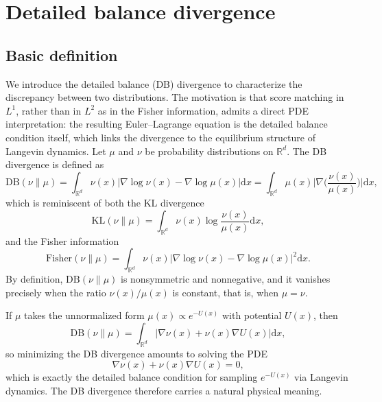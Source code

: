 \documentclass{article}
\newcommand{\D}{\mathrm{d}}
\newcommand{\DB}{\mathrm{DB}}
\newcommand{\KL}{\mathrm{KL}}
\newcommand{\Fish}{\mathrm{Fisher}}
\theoremstyle{plain}
\begin{document}
\section{Detailed balance divergence}\label{sec:db-divergence}

\subsection{Basic definition}

We introduce the detailed balance (DB) divergence to characterize the discrepancy between two distributions. The motivation is that score matching in $L^1$, rather than in $L^2$ as in the Fisher information, admits a direct PDE interpretation: the resulting Euler--Lagrange equation is the detailed balance condition itself, which links the divergence to the equilibrium structure of Langevin dynamics. Let $\mu$ and $\nu$ be probability distributions on $\mathbb R^d$. The DB divergence is defined as
\begin{equation}\label{eq:db-def}
    \DB(\nu\|\mu) = \int_{\mathbb R^d} \nu(x) \bigl|\nabla \log \nu(x) - \nabla \log \mu(x) \bigr| \D x = \int_{\mathbb R^d} \mu(x) \biggl|\nabla\biggl(\frac{\nu(x)}{\mu(x)}\biggr)\biggr| \D x,
\end{equation}
which is reminiscent of both the KL divergence
\begin{equation*}
    \KL(\nu\|\mu) = \int_{\mathbb R^d} \nu(x) \log \frac{\nu(x)}{\mu(x)} \D x,
\end{equation*}
and the Fisher information
\begin{equation*}
    \Fish(\nu\|\mu) = \int_{\mathbb R^d} \nu(x) \bigl|\nabla \log \nu(x) - \nabla \log \mu(x) \bigr|^2 \D x.
\end{equation*}
By definition, $\DB(\nu\|\mu)$ is nonsymmetric and nonnegative, and it vanishes precisely when the ratio $\nu(x)/\mu(x)$ is constant, that is, when $\mu = \nu$.

If $\mu$ takes the unnormalized form $\mu(x) \propto e^{-U(x)}$ with potential $U(x)$, then
\begin{equation*}
    \DB(\nu \| \mu) = \int_{\mathbb R^d} \bigl|\nabla \nu(x) + \nu(x)\nabla U(x) \bigr| \D x,
\end{equation*}
so minimizing the DB divergence amounts to solving the PDE
\begin{equation}\label{eq:db-pde}
    \nabla \nu(x) + \nu(x) \nabla U(x) = 0,
\end{equation}
which is exactly the detailed balance condition for sampling $e^{-U(x)}$ via Langevin dynamics. The DB divergence therefore carries a natural physical meaning.
\end{document}
